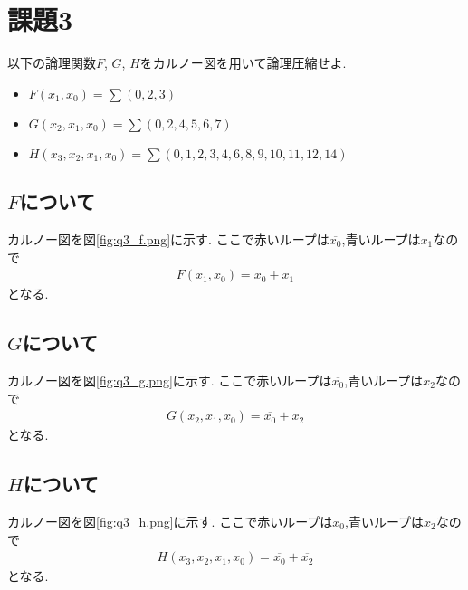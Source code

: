 \section{課題3}
以下の論理関数$F$, $G$, $H$をカルノー図を用いて論理圧縮せよ.
\begin{itemize}
  \item $F(x_1,x_0)=\sum(0,2,3)$
  \item $G(x_2,x_1,x_0)=\sum(0,2,4,5,6,7)$
  \item $H(x_3,x_2,x_1,x_0)=\sum(0,1,2,3,4,6,8,9,10,11,12,14)$
\end{itemize}
\subsection{$F$について}
カルノー図を図\ref{fig:q3_f.png}に示す.
ここで赤いループは$\overline{x_0}$,青いループは$x_1$なので
\begin{align*}
  F(x_1,x_0)=\overline{x_0}+x_1
\end{align*}
となる.
\subsection{$G$について}
カルノー図を図\ref{fig:q3_g.png}に示す.
ここで赤いループは$\overline{x_0}$,青いループは$x_2$なので
\begin{align*}
  G(x_2,x_1,x_0)=\overline{x_0}+x_2
\end{align*}
となる.
\subsection{$H$について}
カルノー図を図\ref{fig:q3_h.png}に示す.
ここで赤いループは$\overline{x_0}$,青いループは$\overline{x_2}$なので
\begin{align*}
  H(x_3,x_2,x_1,x_0)=\overline{x_0}+\overline{x_2}
\end{align*}
となる.
